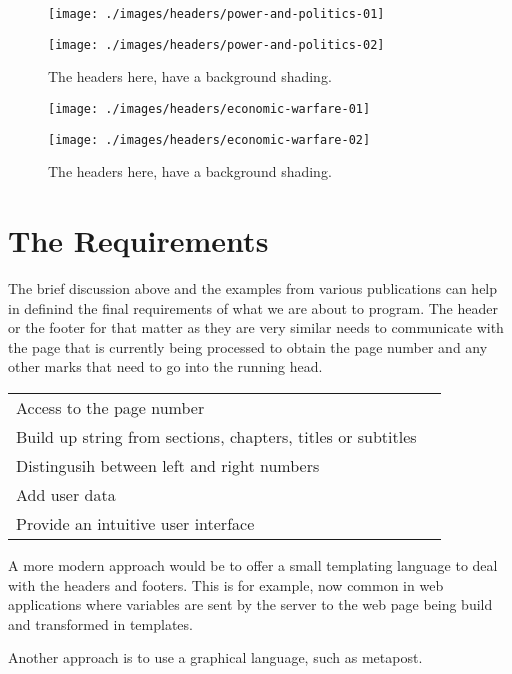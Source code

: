 \begin{figure}[htp]
\texttt{[image: ./images/headers/power-and-politics-01]}

\vspace*{1cm}
\texttt{[image: ./images/headers/power-and-politics-02]}

\caption{The headers here, have a background shading.}
\end{figure}

\begin{figure}[htp]
\texttt{[image: ./images/headers/economic-warfare-01]}

\vspace*{1cm}
\texttt{[image: ./images/headers/economic-warfare-02]}

\caption{The headers here, have a background shading.}
\end{figure}


\section{The Requirements}

The brief discussion above and the examples from various publications can help in definind the final requirements of what we are about to program. The header or the footer for that matter as they are very similar needs to communicate with the page that is currently being processed to obtain the page number and any other marks that need to go into the running head.

\begin{tabular}{>{\raggedright}p{5cm}l}
Access to the page number & \\
Build up string from sections, chapters, titles or subtitles &\\
Distingusih between left and right numbers &\\
Add user data  &\\
Provide an intuitive user interface&\\
\end{tabular}

A more modern approach would be to offer a small templating language to deal with the headers and footers. This is for example, now common in web applications where variables are sent by the server to the web page being build and transformed in templates.

Another approach is to use a graphical language, such as metapost.

